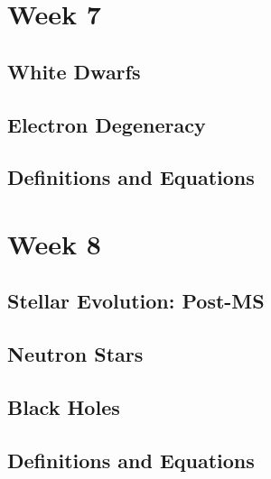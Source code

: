 \documentclass[a4paper,10pt]{article}
\begin{document}
 

\newpage
\section{Week 7}

\subsection{White Dwarfs}

\subsection{Electron Degeneracy}

\subsection{Definitions and Equations}

\newpage
\section{Week 8}

\subsection{Stellar Evolution: Post-MS}

\subsection{Neutron Stars}

\subsection{Black Holes}

\subsection{Definitions and Equations}
\end{document}
